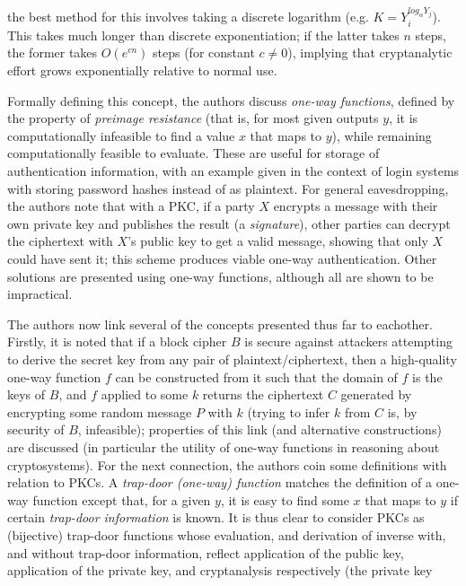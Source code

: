 \documentclass[11pt]{article}
\begin{document}
the best method for this involves taking a discrete logarithm (e.g.  \( K =
Y_i^{log_\alpha{}Y_j} \)). This takes much longer than discrete exponentiation;
if the latter takes \( n \) steps, the former takes \( O(e^{cn}) \) steps (for
constant \( c \neq 0 \)), implying that cryptanalytic effort grows exponentially
relative to normal use.
\par
Formally defining this concept, the authors discuss \textit{one-way functions},
defined by the property of \textit{preimage resistance} (that is, for most given
outputs \( y \), it is computationally infeasible to find a value \( x \) that
maps to \( y \)), while remaining computationally feasible to evaluate.  These
are useful for storage of authentication information, with an example given in
the context of login systems with storing password hashes instead of as
plaintext. For general eavesdropping, the authors note that with a PKC, if a
party \( X \) encrypts a message with their own private key and publishes the
result (a \textit{signature}), other parties can decrypt the ciphertext with 
\( X \)'s public key to get a valid message, showing that only \( X \) could
have sent it; this scheme produces viable one-way authentication. Other
solutions are presented using one-way functions, although all are shown to be
impractical.
\par
The authors now link several of the concepts presented thus far to eachother.
Firstly, it is noted that if a block cipher \( B \) is secure against attackers
attempting to derive the secret key from any pair of plaintext/ciphertext, then
a high-quality one-way function \( f \) can be constructed from it such that
the domain of \( f \) is the keys of \( B \), and \( f \) applied to some 
\( k \) returns the ciphertext \( C \) generated by encrypting some random
message \( P \) with \( k \) (trying to infer \( k \) from \( C \) is, by
security of \( B \), infeasible); properties of this link (and alternative
constructions) are discussed (in particular the utility of one-way functions in
reasoning about cryptosystems). For the next connection, the authors coin some
definitions with relation to PKCs. A \textit{trap-door (one-way) function}
matches the definition of a one-way function except that, for a given \( y \),
it is easy to find some \( x \) that maps to \( y \) if certain
\textit{trap-door information} is known. It is thus clear to consider PKCs as
(bijective) trap-door functions whose evaluation, and derivation of inverse
with, and without trap-door information, reflect application of the public key,
application of the private key, and cryptanalysis respectively (the private key
\end{document}
